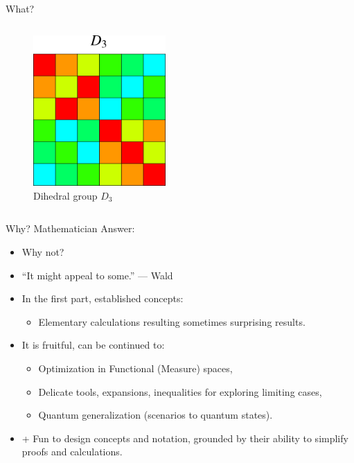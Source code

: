 \documentclass{beamer}
\theoremstyle{definition}
\begin{document}
\begin{frame}{What?}
\begin{columns}
\begin{column}{0.3\textwidth}
        \begin{figure}
    \centering
        \includegraphics[width=0.45\textwidth]{img/DihedralGroupD3Table.png}
        \caption{\small \centering Dihedral group $D_3$}
    \end{figure}
\end{column}
        

\end{columns}

\end{frame}





\begin{frame}{Why? Mathematician Answer:}

\begin{itemize}
    \item Why not?
    \item ``It might appeal to some.'' --- Wald
    \item In the first part, established concepts:
    \begin{itemize}
        \item Elementary calculations resulting sometimes surprising results.
    \end{itemize}
    \item It is fruitful, can be continued to:
    \begin{itemize}
        \item Optimization in Functional (Measure) spaces,
        \item Delicate tools, expansions, inequalities for exploring limiting cases,
        \item Quantum generalization (scenarios to quantum states).
    \end{itemize}
    \item + Fun to design concepts and notation, grounded by their ability to simplify proofs and calculations.
\end{itemize}



\end{frame}
\end{document}

